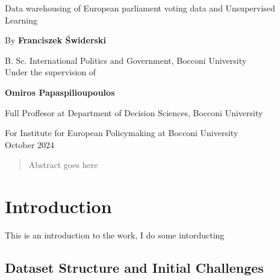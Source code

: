 \documentclass{report}
\begin{document}
    \begin{titlepage}
        \centering

        {\Huge Data warehousing of European parliament voting data and Unsupervised Learning\\}

        \vspace{1cm}

        {By \textbf{Franciszek Świderski}\\}

        \vspace{1cm}

        {B. Sc. International Politics and Government, Bocconi University\\}
        \vspace{1cm}
        {Under the supervision of\\}
        \vspace{1cm}

        {\textbf{Omiros Papaspilioupoulos}\\}

        \vspace{1cm}
        {Full Proffesor at Department of Decision Sciences, Bocconi University\\}
        \vspace{1cm}

        {For Institute for European Policymaking at Bocconi University\\}
        \vspace{1cm}
        {October 2024\\}

        \vspace{5cm} %


    \end{titlepage}

    \begin{abstract}
        Abstract goes here
    \end{abstract}

    \tableofcontents


    \chapter{Introduction}
        This is an introduction to the work, I do some intorducting


        \section{Dataset Structure and Initial Challenges}
\end{document}
